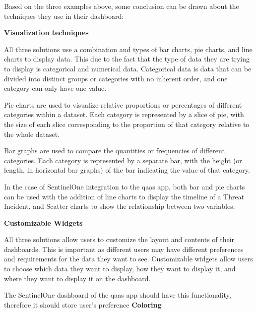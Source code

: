 \begin{multicols}{2}
      Based on the three examples above, some conclusion can be drawn about the techniques they use in their
      dashboard:

      \textbf{Visualization techniques}

      All three solutions use a combination and types of bar charts, pie charts, and line charts to display data.
      This due to the fact that the type of data they are trying to display is categorical and numerical data.
      Categorical data is data that can be divided into distinct groups or categories with no inherent order, and
      one category  can only have one value.

      Pie charts are used to visualize relative proportions or percentages of different categories within a
      dataset. Each category is represented by a slice of pie, with the size of each slice corresponding to the
      proportion of that category relative to the whole dataset.

      Bar graphs are used to compare the quantities or frequencies of different categories. Each category is
      represented by a separate bar, with the height (or length, in horizontal bar graphs) of the bar indicating
      the value of that category.

      In the case of SentinelOne integration to the \acrshort{qaas} app, both bar and pie charts can be used with
      the addition of line charts to display the timeline of a Threat Incident, and Scatter charts to show the
      relationship between two variables.

      \textbf{Customizable Widgets}

      All three solutions allow users to customize the layout and contents of their dashboards. This is important
      as different users may have different preferences and requirements for the data they want to see. Customizable
      widgets allow users to choose which data they want to display, how they want to display it, and where they
      want to display it on the dashboard.

      The SentinelOne dashboard of the \acrshort{qaas} app should have this functionality, therefore it should
      store user's preference
      \textbf{Coloring}


\end{multicols}
